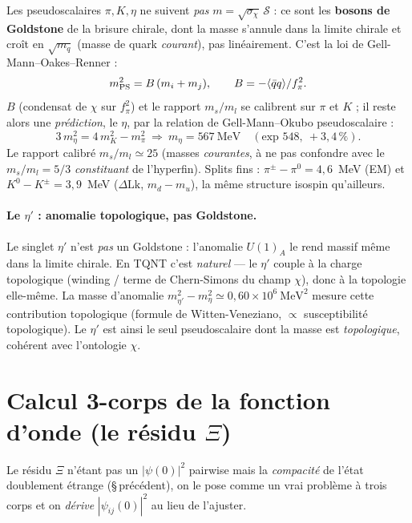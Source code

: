 \documentclass[11pt]{article}
\begin{document}
Les pseudoscalaires $\pi,K,\eta$ ne suivent \emph{pas} $m=\sqrt{\sigma_\chi}\,\mathcal{S}$ : ce sont les \textbf{bosons de Goldstone} de la brisure chirale, dont la masse s'annule dans la limite chirale et croît en $\sqrt{m_q}$ (masse de quark \emph{courant}), pas linéairement. C'est la loi de Gell-Mann--Oakes--Renner :
\[
m_{\rm PS}^2=B\,(m_i+m_j),\qquad B=-\langle\bar qq\rangle/f_\pi^2 .
\]
$B$ (condensat de $\chi$ sur $f_\pi^2$) et le rapport $m_s/m_l$ se calibrent sur $\pi$ et $K$ ; il reste alors une \emph{prédiction}, le $\eta$, par la relation de Gell-Mann--Okubo pseudoscalaire :
\[
3\,m_\eta^2=4\,m_K^2-m_\pi^2\ \Rightarrow\ m_\eta=567~\text{MeV}\quad(\text{exp }548,\ +3{,}4\,\%).
\]
Le rapport calibré $m_s/m_l\simeq25$ (masses \emph{courantes}, à ne pas confondre avec le $m_s/m_l=5/3$ \emph{constituant} de l'hyperfin). Splits fins : $\pi^\pm{-}\pi^0=4{,}6$~MeV (EM) et $K^0{-}K^\pm=3{,}9$~MeV ($\Delta\mathrm{Lk}$, $m_d{-}m_u$), la même structure isospin qu'ailleurs.

\paragraph{Le $\eta'$ : anomalie topologique, pas Goldstone.} Le singlet $\eta'$ n'est \emph{pas} un Goldstone : l'anomalie $U(1)_A$ le rend massif même dans la limite chirale. En TQNT c'est \emph{naturel} --- le $\eta'$ couple à la charge topologique (winding / terme de Chern-Simons du champ $\chi$), donc à la topologie elle-même. La masse d'anomalie $m_{\eta'}^2-m_\eta^2\simeq0{,}60\times10^6~\text{MeV}^2$ mesure cette contribution topologique (formule de Witten-Veneziano, $\propto$ susceptibilité topologique). Le $\eta'$ est ainsi le seul pseudoscalaire dont la masse est \emph{topologique}, cohérent avec l'ontologie $\chi$.

\section{Calcul 3-corps de la fonction d'onde (le résidu $\Xi$)}

Le résidu $\Xi$ n'étant pas un $|\psi(0)|^2$ pairwise mais la \emph{compacité} de l'état doublement étrange (\S\,précédent), on le pose comme un vrai problème à trois corps et on \emph{dérive} $|\psi_{ij}(0)|^2$ au lieu de l'ajuster.
\end{document}
